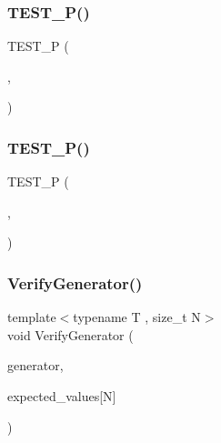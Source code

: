 \subsubsection{\texorpdfstring{TEST\_P()}{TEST\_P()}\hspace{0.1cm}{\footnotesize\ttfamily [17/18]}}
{\footnotesize\ttfamily T\+E\+S\+T\+\_\+P (\begin{DoxyParamCaption}\item[{\mbox{\hyperlink{class_parameterized_derived_test}{Parameterized\+Derived\+Test}}}]{,  }\item[{Sees\+Sequence}]{ }\end{DoxyParamCaption})}

\mbox{\label{_obj__test_2lib_2googletest-master_2googletest_2test_2googletest-param-test-test_8cc_af93c1bfa3f3b8f1670128c9afc5143b2}} 
\subsubsection{\texorpdfstring{TEST\_P()}{TEST\_P()}\hspace{0.1cm}{\footnotesize\ttfamily [18/18]}}
{\footnotesize\ttfamily T\+E\+S\+T\+\_\+P (\begin{DoxyParamCaption}\item[{\mbox{\hyperlink{class_my_enum_test}{My\+Enum\+Test}}}]{,  }\item[{Checks\+Param\+More\+Than\+Zero}]{ }\end{DoxyParamCaption})}

\mbox{\label{_obj__test_2lib_2googletest-master_2googletest_2test_2googletest-param-test-test_8cc_a11c99cfbf44746868aa44105130887f7}} 
\subsubsection{\texorpdfstring{VerifyGenerator()}{VerifyGenerator()}}
{\footnotesize\ttfamily template$<$typename T , size\+\_\+t N$>$ \\
void Verify\+Generator (\begin{DoxyParamCaption}\item[{const Param\+Generator$<$ T $>$ \&}]{generator,  }\item[{const T(\&)}]{expected\+\_\+values\mbox{[}\+N\mbox{]} }\end{DoxyParamCaption})}

